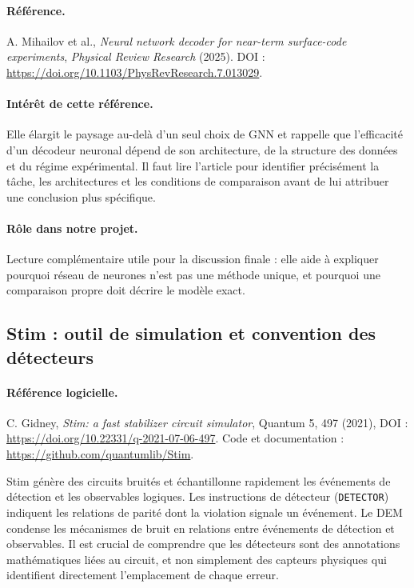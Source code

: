 \documentclass[11pt,a4paper]{article}
\begin{document}
\paragraph{Référence.}
A. Mihailov et al., \emph{Neural network decoder for near-term surface-code
experiments}, \emph{Physical Review Research} (2025).
DOI : \url{https://doi.org/10.1103/PhysRevResearch.7.013029}.

\paragraph{Intérêt de cette référence.}
Elle élargit le paysage au-delà d'un seul choix de GNN et rappelle que
l'efficacité d'un décodeur neuronal dépend de son architecture, de la
structure des données et du régime expérimental. Il faut lire l'article
pour identifier précisément la tâche, les architectures et les conditions
de comparaison avant de lui attribuer une conclusion plus spécifique.

\paragraph{Rôle dans notre projet.}
Lecture complémentaire utile pour la discussion finale : elle aide à
expliquer pourquoi \og réseau de neurones \fg{} n'est pas une méthode unique,
et pourquoi une comparaison propre doit décrire le modèle exact.

\subsection{Stim : outil de simulation et convention des détecteurs}

\paragraph{Référence logicielle.}
C. Gidney, \emph{Stim: a fast stabilizer circuit simulator}, Quantum 5,
497 (2021), DOI : \url{https://doi.org/10.22331/q-2021-07-06-497}.
Code et documentation : \url{https://github.com/quantumlib/Stim}.

Stim génère des circuits bruités et échantillonne rapidement les événements
de détection et les observables logiques. Les instructions de détecteur
(\texttt{DETECTOR}) indiquent les relations de parité dont la violation
signale un événement. Le DEM condense les mécanismes de bruit en relations
entre événements de détection et observables. Il est crucial de comprendre
que les détecteurs sont des annotations mathématiques liées au circuit,
et non simplement des capteurs physiques qui identifient directement
l'emplacement de chaque erreur.
\end{document}
